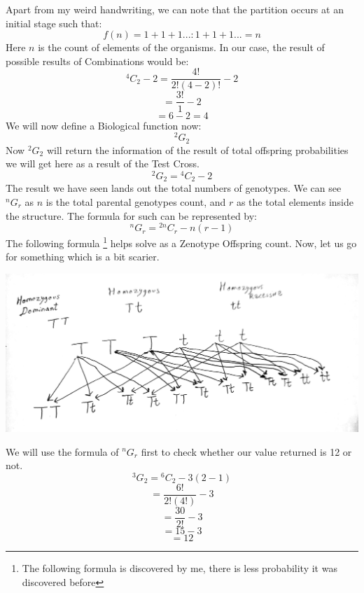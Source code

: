 \documentclass[a4paper,12pt]{book}[2004/02/16]
\theoremstyle{ilemma}
\theoremstyle{itheorem}
\theoremstyle{iother}
\theoremstyle{icorollary}
\theoremstyle{numcorollary}
\theoremstyle{idefinition}
\begin{document}
Apart from my weird handwriting, we can note that the partition occurs at an initial stage such that:
$$
f(n) = 1+1+1...:1+1+1...=n
$$
Here $n$ is the count of elements of the organisms. In our case, the result of possible results of Combinations would be:
$$
{}^{4}C_{2}-2 = \frac{4!}{2!(4-2)!}-2
$$
$$
= \frac{3!}{1}-2
$$
$$
=6-2=4
$$
We will now define a Biological function now:
$$
{}^{2}G_{2}
$$
Now ${}^{2}G_{2}$ will return the information of the result of total offspring probabilities we will get here as a result of the Test Cross.
$$
{}^{2}G_{2} = {}^{4}C_{2}-2
$$
The result we have seen lands out the total numbers of genotypes.  We can see ${}^{n}G_{r}$ as $n$ is the total parental genotypes count, and $r$ as the total elements inside the structure. The formula for such can be represented by:
$$
{}^{n}G_{r} = {}^{2n}C_{r} -  n(r-1)
$$
The following formula \footnote{The following formula is discovered by me, there is less probability it was discovered before}  helps solve as a Zenotype Offspring count. Now, let us go for something which is a bit scarier.

\includegraphics[width=\textwidth]{New Doc 12-12-2022 19.57_4-modified.jpg}

We will use the formula of ${}^{n}G_{r}$ first to check whether our value returned is 12 or not.
$$
{}^{3}G_{2} = {}^{6}C_{2} -  3(2-1)
$$
$$
=\frac{6!}{2!(4!)} - 3
$$
$$
=\frac{30}{2!} - 3
$$
$$
=15-3
$$
$$
=12
$$
\end{document}
